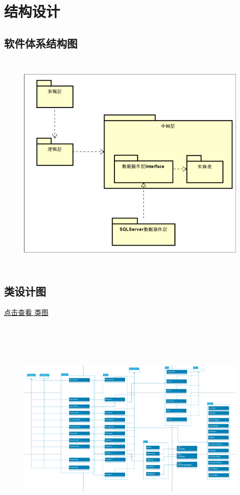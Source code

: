 \chapter{结构设计}

\section{软件体系结构图}

\begin{figure}[h]
\centering
\includegraphics[height=11.0cm,width=14.0cm]{design/image/tixi.png}
\end{figure}
\newpage
\section{类设计图}

\href{https://documentation-1303131952.cos.ap-beijing.myqcloud.com/iron_man/%E7%B1%BB%E5%9B%BE.svg}{点击查看 类图}

\begin{figure}[h]
    \centering
    \includegraphics[height=11.0cm,width=14.0cm]{design/image/class.png} 
    \end{figure}
    \newpage    